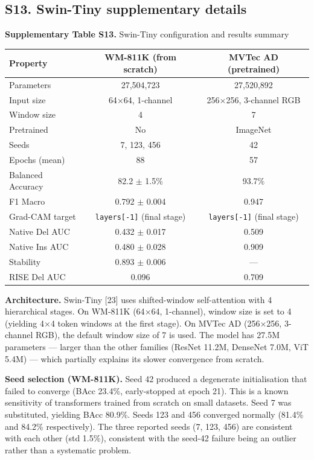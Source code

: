 \documentclass[11pt,a4paper]{article}
\begin{document}
\subsection*{S13. Swin-Tiny supplementary details}

\begin{center}
\small \textbf{Supplementary Table S13.} Swin-Tiny configuration and results summary
\end{center}

\begin{tabular}{lcc}
\toprule
Property & WM-811K (from scratch) & MVTec AD (pretrained) \\
\midrule
Parameters & 27,504,723 & 27,520,892 \\
Input size & 64$\times$64, 1-channel & 256$\times$256, 3-channel RGB \\
Window size & 4 & 7 \\
Pretrained & No & ImageNet \\
Seeds & 7, 123, 456 & 42 \\
Epochs (mean) & 88 & 57 \\
Balanced Accuracy & 82.2 $\pm$ 1.5\% & 93.7\% \\
F1 Macro & 0.792 $\pm$ 0.004 & 0.947 \\
Grad-CAM target & \texttt{layers[-1]} (final stage) & \texttt{layers[-1]} (final stage) \\
Native Del AUC & 0.432 $\pm$ 0.017 & 0.509 \\
Native Ins AUC & 0.480 $\pm$ 0.028 & 0.909 \\
Stability & 0.893 $\pm$ 0.006 & --- \\
RISE Del AUC & 0.096 & 0.709 \\
\bottomrule
\end{tabular}


\textbf{Architecture.} Swin-Tiny [23] uses shifted-window self-attention with 4 hierarchical stages. On WM-811K (64$\times$64, 1-channel), window size is set to 4 (yielding 4$\times$4 token windows at the first stage). On MVTec AD (256$\times$256, 3-channel RGB), the default window size of 7 is used. The model has 27.5M parameters --- larger than the other families (ResNet 11.2M, DenseNet 7.0M, ViT 5.4M) --- which partially explains its slower convergence from scratch.

\textbf{Seed selection (WM-811K).} Seed 42 produced a degenerate initialisation that failed to converge (BAcc 23.4\%, early-stopped at epoch 21). This is a known sensitivity of transformers trained from scratch on small datasets. Seed 7 was substituted, yielding BAcc 80.9\%. Seeds 123 and 456 converged normally (81.4\% and 84.2\% respectively). The three reported seeds (7, 123, 456) are consistent with each other (std 1.5\%), consistent with the seed-42 failure being an outlier rather than a systematic problem.
\end{document}
